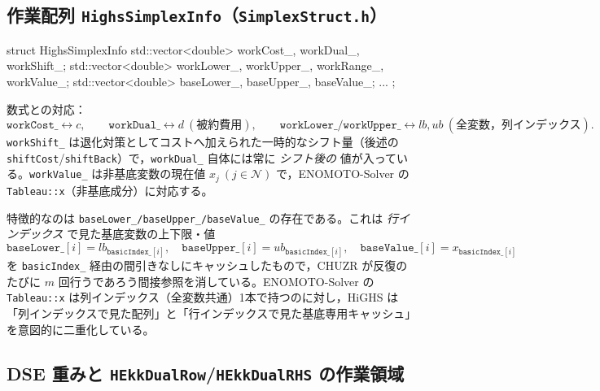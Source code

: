\documentclass[11pt,a4paper]{ltjsarticle}
\newcommand{\code}[1]{\texttt{#1}}
\begin{document}
\subsection{作業配列 \code{HighsSimplexInfo}（\code{SimplexStruct.h}）}

\begin{cppcode}
struct HighsSimplexInfo {
  std::vector<double> workCost_, workDual_, workShift_;
  std::vector<double> workLower_, workUpper_, workRange_, workValue_;
  std::vector<double> baseLower_, baseUpper_, baseValue_;
  ...
};
\end{cppcode}
数式との対応：
\[
  \code{workCost\_} \leftrightarrow c,\qquad
  \code{workDual\_} \leftrightarrow d\ (\text{被約費用}),\qquad
  \code{workLower\_/workUpper\_} \leftrightarrow lb, ub \ (\text{全変数，列インデックス}).
\]
\code{workShift\_} は退化対策としてコストへ加えられた一時的なシフト量（後述の \code{shiftCost}/\code{shiftBack}）で，\code{workDual\_} 自体には常に \emph{シフト後の} 値が入っている。\code{workValue\_} は非基底変数の現在値 $x_j\ (j\in\mathcal N)$ で，ENOMOTO-Solver の \code{Tableau::x}（非基底成分）に対応する。

特徴的なのは \code{baseLower\_/baseUpper\_/baseValue\_} の存在である。これは \emph{行インデックス} で見た基底変数の上下限・値
\[
  \code{baseLower\_}[i] = lb_{\code{basicIndex\_}[i]}, \quad
  \code{baseUpper\_}[i] = ub_{\code{basicIndex\_}[i]}, \quad
  \code{baseValue\_}[i] = x_{\code{basicIndex\_}[i]}
\]
を \code{basicIndex\_} 経由の間引きなしにキャッシュしたもので，CHUZR が反復のたびに $m$ 回行うであろう間接参照を消している。ENOMOTO-Solver の \code{Tableau::x} は列インデックス（全変数共通）1本で持つのに対し，HiGHS は「列インデックスで見た配列」と「行インデックスで見た基底専用キャッシュ」を意図的に二重化している。

\subsection{DSE 重みと \code{HEkkDualRow}/\code{HEkkDualRHS} の作業領域}
\end{document}
